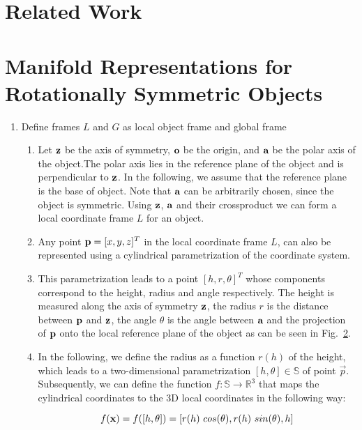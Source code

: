 \documentclass{aamas2015}
\begin{document}
\begin{enumerate}
\section{Related Work}

\section{Manifold Representations for Rotationally Symmetric Objects}
\begin{enumerate}
	\item Define frames $L$ and $G$ as local object frame and global frame
	\begin{enumerate}
		\item 
		Let $\textbf{z}$ be the axis of symmetry, $\textbf{o}$ be the origin, and $\textbf{a}$ be the polar axis of the object.The polar axis lies in the reference plane of the object and is perpendicular to $\textbf{z}$. In the following, we assume that the reference plane is the base of object. Note that $\textbf{a}$ can be arbitrarily chosen, since the object is symmetric. Using $\textbf{z}$, $\textbf{a}$ and their crossproduct we can form a local coordinate frame $L$ for an object.
		
		\item Any point $\textbf{p} = [x,y,z]^T$ in the local coordinate frame $L$, can also be represented using a cylindrical parametrization of the coordinate system. 
		
		\item This parametrization leads to a point $[h, r, \theta]^T$ whose components correspond to the height, radius and angle respectively. The height is measured along the axis of symmetry $\textbf{z}$, the radius $r$ is the distance between $\textbf{p}$ and $\textbf{z}$, the angle $\theta$ is the angle between $\textbf{a}$ and the projection of $\textbf{p} $ onto the local reference plane of the object as can be seen in Fig.~\ref{}. 
		
		\item In the following, we define the radius as a function $r(h)$ of the height, which leads to a two-dimensional parametrization $[h, \theta] \in \mathbb{S}$ of point $\vec{p}$. Subsequently, we can define the function $f: \mathbb{S} \rightarrow \mathbb{R}^3$ that maps the cylindrical coordinates to the 3D local coordinates in the following way:
		
		\begin{equation}
			f(\textbf{x}) = f([h, \theta]) = [r(h) ~ cos(\theta), r(h) ~ sin(\theta), h]
		\end{equation}
		

\end{enumerate}
\end{enumerate}
\end{enumerate}
\end{document}
